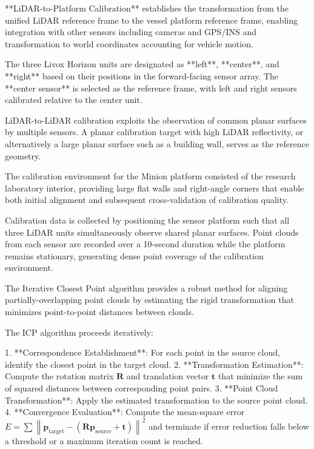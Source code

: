 **LiDAR-to-Platform Calibration** establishes the transformation from the unified LiDAR reference frame to the vessel platform reference frame, enabling integration with other sensors including cameras and GPS/INS and transformation to world coordinates accounting for vehicle motion.


The three Livox Horizon units are designated as **left**, **center**, and **right** based on their positions in the forward-facing sensor array.
The **center sensor** is selected as the reference frame, with left and right sensors calibrated relative to the center unit.


LiDAR-to-LiDAR calibration exploits the observation of common planar surfaces by multiple sensors.
A planar calibration target with high LiDAR reflectivity, or alternatively a large planar surface such as a building wall, serves as the reference geometry.

The calibration environment for the Minion platform consisted of the research laboratory interior, providing large flat walls and right-angle corners that enable both initial alignment and subsequent cross-validation of calibration quality.

Calibration data is collected by positioning the sensor platform such that all three LiDAR units simultaneously observe shared planar surfaces.
Point clouds from each sensor are recorded over a 10-second duration while the platform remains stationary, generating dense point coverage of the calibration environment.


The Iterative Closest Point algorithm provides a robust method for aligning partially-overlapping point clouds by estimating the rigid transformation that minimizes point-to-point distances between clouds.

The ICP algorithm proceeds iteratively:

1. **Correspondence Establishment**: For each point in the source cloud, identify the closest point in the target cloud.
2. **Transformation Estimation**: Compute the rotation matrix $\mathbf{R}$ and translation vector $\mathbf{t}$ that minimize the sum of squared distances between corresponding point pairs.
3. **Point Cloud Transformation**: Apply the estimated transformation to the source point cloud.
4. **Convergence Evaluation**: Compute the mean-square error $E = \sum \left\| \mathbf{p}_{\text{target}} - (\mathbf{R} \mathbf{p}_{\text{source}} + \mathbf{t}) \right\|^2$ and terminate if error reduction falls below a threshold or a maximum iteration count is reached.

